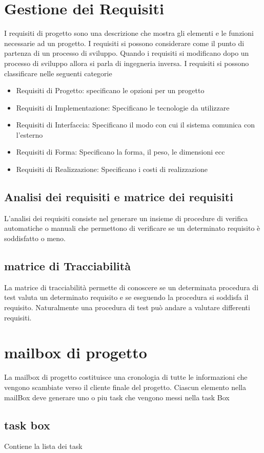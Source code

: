 \documentclass[10pt,a4paper]{book}
\begin{document}
\section{Gestione dei Requisiti}
I requisiti di progetto sono una descrizione che mostra gli elementi e le funzioni necessarie ad un progetto. I requisiti si possono considerare come il punto di partenza di un processo di sviluppo. Quando i requisiti si modificano dopo un processo di sviluppo allora si parla di ingegneria inversa.
I requisiti si possono classificare nelle seguenti categorie
\begin{itemize}
\item Requisiti di Progetto: specificano le opzioni per un progetto
\item Requisiti di Implementazione: Specificano le tecnologie da utilizzare
\item Requisiti di Interfaccia: Specificano il modo con cui il sistema comunica con l'esterno
\item Requisiti di Forma: Specificano la forma, il peso, le dimensioni ecc
\item Requisiti di Realizzazione: Specificano i costi di realizzazione
\end{itemize}

\subsection{Analisi dei requisiti e matrice dei requisiti}
L'analisi dei requisiti  consiste nel generare un insieme di procedure di verifica automatiche o manuali che permettono di verificare se un determinato requisito è soddisfatto o meno. 


\subsection{matrice di Tracciabilità}
La matrice di tracciabilità permette di conoscere se un determinata procedura di test valuta un determinato requisito e se eseguendo la procedura si soddisfa il requisito. Naturalmente una procedura di test può andare a valutare differenti requisiti.

\section{mailbox di progetto}
La mailbox di progetto costituisce una cronologia di tutte le informazioni che vengono scambiate verso il cliente finale del progetto. Ciascun elemento nella mailBox deve generare uno o piu task che vengono messi nella task Box

\subsection{task box}
Contiene la lista dei task
\end{document}
